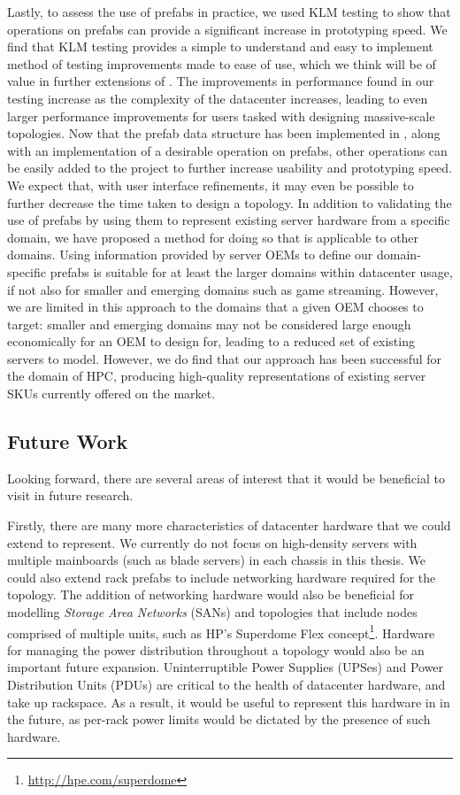 \documentclass[11pt]{article}
\begin{document}
		Lastly, to assess the use of prefabs in practice, we used KLM testing to show that operations on prefabs can provide a significant increase in prototyping speed.
		We find that KLM testing provides a simple to understand and easy to implement method of testing improvements made to ease of use, which we think will be of value in further extensions of \opendc{}.
		The improvements in performance found in our testing increase as the complexity of the datacenter increases, leading to even larger performance improvements for users tasked with designing massive-scale topologies.
		Now that the prefab data structure has been implemented in \opendc{}, along with an implementation of a desirable operation on prefabs, other operations can be easily added to the project to further increase usability and prototyping speed.
		We expect that, with user interface refinements, it may even be possible to further decrease the time taken to design a topology.
		In addition to validating the use of prefabs by using them to represent existing server hardware from a specific domain, we have proposed a method for doing so that is applicable to other domains.
		Using information provided by server OEMs to define our domain-specific prefabs is suitable for at least the larger domains within datacenter usage, if not also for smaller and emerging domains such as game streaming.
		However, we are limited in this approach to the domains that a given OEM chooses to target: smaller and emerging domains may not be considered large enough economically for an OEM to design for, leading to a reduced set of existing servers to model.
		However, we do find that our approach has been successful for the domain of HPC, producing high-quality representations of existing server SKUs currently offered on the market.


	\subsection{Future Work} \label{sec:future-work}
		Looking forward, there are several areas of interest that it would be beneficial to visit in future research.

		Firstly, there are many more characteristics of datacenter hardware that we could extend \opendc{} to represent. 
		We currently do not focus on high-density servers with multiple mainboards (such as blade servers) in each chassis in this thesis. 
		We could also extend rack prefabs to include networking hardware required for the topology. 
		The addition of networking hardware would also be beneficial for modelling \textit{Storage Area Networks} (SANs) and topologies that include nodes comprised of multiple units, such as HP's Superdome Flex concept\footnote{\url{http://hpe.com/superdome}}.
		Hardware for managing the power distribution throughout a topology would also be an important future expansion.
		Uninterruptible Power Supplies (UPSes) and Power Distribution Units (PDUs) are critical to the health of datacenter hardware, and take up rackspace.
		As a result, it would be useful to represent this hardware in \opendc{} in the future, as per-rack power limits would be dictated by the presence of such hardware.
\end{document}
